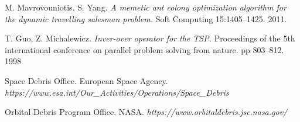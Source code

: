 \documentclass[a4paper,9pt,journal,twoside,compsoc]{PPIEEEtran}
\begin{document}
\begin{thebibliography}{9}
M. Mavrovouniotis, S. Yang.
\textit{A memetic ant colony optimization algorithm for the dynamic travelling salesman problem.}
Soft Computing 15:1405–1425. 2011.

T. Guo, Z. Michalewicz.
\textit{Inver-over operator for the TSP.}
Proceedings of the 5th international conference on parallel problem solving from nature. pp 803–812. 1998

Space Debris Office. European Space Agency.
\textit{https://www.esa.int/Our\_Activities/Operations/Space\_Debris}

Orbital Debris Program Office. NASA.
\textit{https://www.orbitaldebris.jsc.nasa.gov/}

\end{thebibliography}




\newpage
\onecolumn
\end{document}
